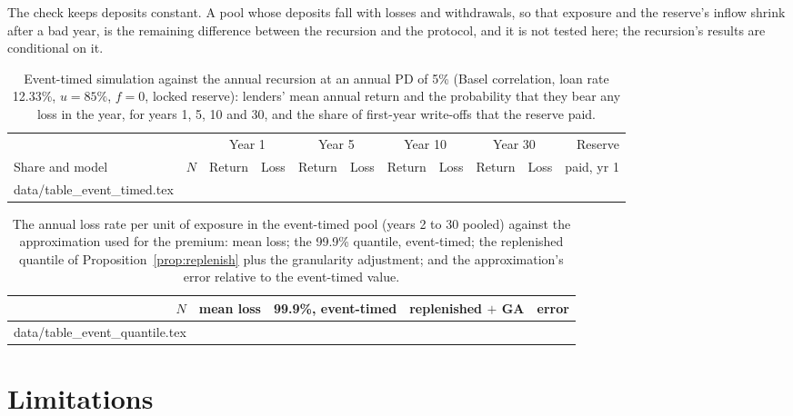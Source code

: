 \documentclass[11pt]{article}
\makeatletter
\theoremstyle{plain}
\theoremstyle{definition}
\newcommand{\inputrows}[1]{\@@input #1 }
\makeatother
\begin{document}
The check keeps deposits constant. A pool whose deposits fall with losses and withdrawals, so that
exposure and the reserve's inflow shrink after a bad year, is the remaining difference between the
recursion and the protocol, and it is not tested here; the recursion's results are conditional on it.

\begin{table}[ht]
  \centering\small
  \caption{Event-timed simulation against the annual recursion at an annual PD of 5\% (Basel
  correlation, loan rate 12.33\%, $u=85\%$, $f=0$, locked reserve): lenders' mean annual return and the
  probability that they bear any loss in the year, for years 1, 5, 10 and 30, and the share of
  first-year write-offs that the reserve paid.}
  \label{tab:event}
  \begin{tabular}{lrrrrrrrrrr}
    \toprule
    & & \multicolumn{2}{c}{Year 1} & \multicolumn{2}{c}{Year 5} & \multicolumn{2}{c}{Year 10} & \multicolumn{2}{c}{Year 30} & Reserve \\
    \cmidrule(lr){3-4}\cmidrule(lr){5-6}\cmidrule(lr){7-8}\cmidrule(lr){9-10}
    Share and model & $N$ & Return & Loss & Return & Loss & Return & Loss & Return & Loss & paid, yr 1 \\
    \midrule
    \inputrows{data/table_event_timed.tex}
    \bottomrule
  \end{tabular}
\end{table}

\begin{table}[ht]
  \centering\small
  \caption{The annual loss rate per unit of exposure in the event-timed pool (years 2 to 30 pooled)
  against the approximation used for the premium: mean loss; the 99.9\% quantile, event-timed; the
  replenished quantile of Proposition~\ref{prop:replenish} plus the granularity adjustment; and the
  approximation's error relative to the event-timed value.}
  \label{tab:eventq}
  \begin{tabular}{rrrrr}
    \toprule
    $N$ & mean loss & 99.9\%, event-timed & replenished $+$ GA & error \\
    \midrule
    \inputrows{data/table_event_quantile.tex}
    \bottomrule
  \end{tabular}
\end{table}

\section{Limitations}\label{sec:limits}
\end{document}
